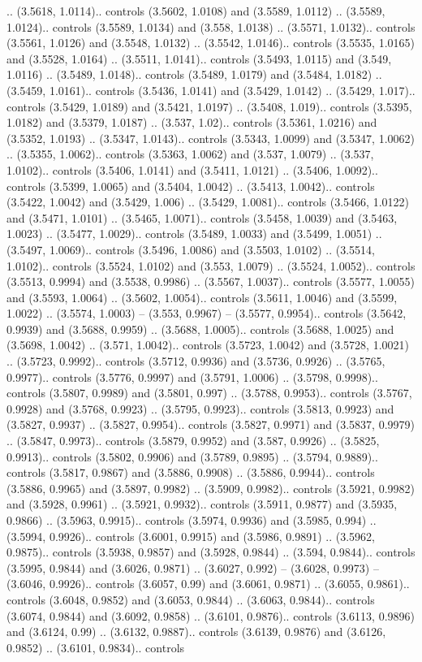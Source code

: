 .. (3.5618, 1.0114).. controls (3.5602, 1.0108) and (3.5589, 1.0112) .. (3.5589, 1.0124).. controls (3.5589, 1.0134) and (3.558, 1.0138) .. (3.5571, 1.0132).. controls (3.5561, 1.0126) and (3.5548, 1.0132) .. (3.5542, 1.0146).. controls (3.5535, 1.0165) and (3.5528, 1.0164) .. (3.5511, 1.0141).. controls (3.5493, 1.0115) and (3.549, 1.0116) .. (3.5489, 1.0148).. controls (3.5489, 1.0179) and (3.5484, 1.0182) .. (3.5459, 1.0161).. controls (3.5436, 1.0141) and (3.5429, 1.0142) .. (3.5429, 1.017).. controls (3.5429, 1.0189) and (3.5421, 1.0197) .. (3.5408, 1.019).. controls (3.5395, 1.0182) and (3.5379, 1.0187) .. (3.537, 1.02).. controls (3.5361, 1.0216) and (3.5352, 1.0193) .. (3.5347, 1.0143).. controls (3.5343, 1.0099) and (3.5347, 1.0062) .. (3.5355, 1.0062).. controls (3.5363, 1.0062) and (3.537, 1.0079) .. (3.537, 1.0102).. controls (3.5406, 1.0141) and (3.5411, 1.0121) .. (3.5406, 1.0092).. controls (3.5399, 1.0065) and (3.5404, 1.0042) .. (3.5413, 1.0042).. controls (3.5422, 1.0042) and (3.5429, 1.006) .. (3.5429, 1.0081).. controls (3.5466, 1.0122) and (3.5471, 1.0101) .. (3.5465, 1.0071).. controls (3.5458, 1.0039) and (3.5463, 1.0023) .. (3.5477, 1.0029).. controls (3.5489, 1.0033) and (3.5499, 1.0051) .. (3.5497, 1.0069).. controls (3.5496, 1.0086) and (3.5503, 1.0102) .. (3.5514, 1.0102).. controls (3.5524, 1.0102) and (3.553, 1.0079) .. (3.5524, 1.0052).. controls (3.5513, 0.9994) and (3.5538, 0.9986) .. (3.5567, 1.0037).. controls (3.5577, 1.0055) and (3.5593, 1.0064) .. (3.5602, 1.0054).. controls (3.5611, 1.0046) and (3.5599, 1.0022) .. (3.5574, 1.0003) -- (3.553, 0.9967) -- (3.5577, 0.9954).. controls (3.5642, 0.9939) and (3.5688, 0.9959) .. (3.5688, 1.0005).. controls (3.5688, 1.0025) and (3.5698, 1.0042) .. (3.571, 1.0042).. controls (3.5723, 1.0042) and (3.5728, 1.0021) .. (3.5723, 0.9992).. controls (3.5712, 0.9936) and (3.5736, 0.9926) .. (3.5765, 0.9977).. controls (3.5776, 0.9997) and (3.5791, 1.0006) .. (3.5798, 0.9998).. controls (3.5807, 0.9989) and (3.5801, 0.997) .. (3.5788, 0.9953).. controls (3.5767, 0.9928) and (3.5768, 0.9923) .. (3.5795, 0.9923).. controls (3.5813, 0.9923) and (3.5827, 0.9937) .. (3.5827, 0.9954).. controls (3.5827, 0.9971) and (3.5837, 0.9979) .. (3.5847, 0.9973).. controls (3.5879, 0.9952) and (3.587, 0.9926) .. (3.5825, 0.9913).. controls (3.5802, 0.9906) and (3.5789, 0.9895) .. (3.5794, 0.9889).. controls (3.5817, 0.9867) and (3.5886, 0.9908) .. (3.5886, 0.9944).. controls (3.5886, 0.9965) and (3.5897, 0.9982) .. (3.5909, 0.9982).. controls (3.5921, 0.9982) and (3.5928, 0.9961) .. (3.5921, 0.9932).. controls (3.5911, 0.9877) and (3.5935, 0.9866) .. (3.5963, 0.9915).. controls (3.5974, 0.9936) and (3.5985, 0.994) .. (3.5994, 0.9926).. controls (3.6001, 0.9915) and (3.5986, 0.9891) .. (3.5962, 0.9875).. controls (3.5938, 0.9857) and (3.5928, 0.9844) .. (3.594, 0.9844).. controls (3.5995, 0.9844) and (3.6026, 0.9871) .. (3.6027, 0.992) -- (3.6028, 0.9973) -- (3.6046, 0.9926).. controls (3.6057, 0.99) and (3.6061, 0.9871) .. (3.6055, 0.9861).. controls (3.6048, 0.9852) and (3.6053, 0.9844) .. (3.6063, 0.9844).. controls (3.6074, 0.9844) and (3.6092, 0.9858) .. (3.6101, 0.9876).. controls (3.6113, 0.9896) and (3.6124, 0.99) .. (3.6132, 0.9887).. controls (3.6139, 0.9876) and (3.6126, 0.9852) .. (3.6101, 0.9834).. controls 